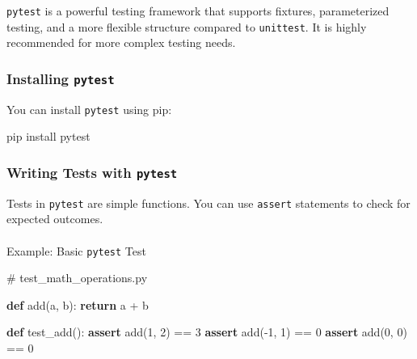 \documentclass[
  letterpaper,
  DIV=11,
  numbers=noendperiod]{scrreprt}
\makeatletter
\let\oldparagraph\paragraph
\renewcommand{\paragraph}{
    \@ifstar
      \xxxParagraphStar
      \xxxParagraphNoStar
  }
\newcommand{\xxxParagraphStar}[1]{\oldparagraph*{#1}\mbox{}}
\newcommand{\xxxParagraphNoStar}[1]{\oldparagraph{#1}\mbox{}}
\newenvironment{Shaded}{\begin{snugshade}}{\end{snugshade}}
\newcommand{\CommentTok}[1]{\textcolor[rgb]{0.37,0.37,0.37}{#1}}
\newcommand{\ControlFlowTok}[1]{\textcolor[rgb]{0.00,0.23,0.31}{\textbf{#1}}}
\newcommand{\DecValTok}[1]{\textcolor[rgb]{0.68,0.00,0.00}{#1}}
\newcommand{\ExtensionTok}[1]{\textcolor[rgb]{0.00,0.23,0.31}{#1}}
\newcommand{\KeywordTok}[1]{\textcolor[rgb]{0.00,0.23,0.31}{\textbf{#1}}}
\newcommand{\NormalTok}[1]{\textcolor[rgb]{0.00,0.23,0.31}{#1}}
\newcommand{\OperatorTok}[1]{\textcolor[rgb]{0.37,0.37,0.37}{#1}}
\makeatother
\begin{document}
\texttt{pytest} is a powerful testing framework that supports fixtures,
parameterized testing, and a more flexible structure compared to
\texttt{unittest}. It is highly recommended for more complex testing
needs.

\subsubsection{\texorpdfstring{Installing
\texttt{pytest}}{Installing pytest}}\label{installing-pytest}

You can install \texttt{pytest} using pip:

\begin{Shaded}
\begin{Highlighting}[]
\ExtensionTok{pip}\NormalTok{ install pytest}
\end{Highlighting}
\end{Shaded}

\subsubsection{\texorpdfstring{Writing Tests with
\texttt{pytest}}{Writing Tests with pytest}}\label{writing-tests-with-pytest}

Tests in \texttt{pytest} are simple functions. You can use
\texttt{assert} statements to check for expected outcomes.

\paragraph{\texorpdfstring{Example: Basic \texttt{pytest}
Test}{Example: Basic pytest Test}}\label{example-basic-pytest-test}

\begin{Shaded}
\begin{Highlighting}[]
\CommentTok{\# test\_math\_operations.py}

\KeywordTok{def}\NormalTok{ add(a, b):}
    \ControlFlowTok{return}\NormalTok{ a }\OperatorTok{+}\NormalTok{ b}

\KeywordTok{def}\NormalTok{ test\_add():}
    \ControlFlowTok{assert}\NormalTok{ add(}\DecValTok{1}\NormalTok{, }\DecValTok{2}\NormalTok{) }\OperatorTok{==} \DecValTok{3}
    \ControlFlowTok{assert}\NormalTok{ add(}\OperatorTok{{-}}\DecValTok{1}\NormalTok{, }\DecValTok{1}\NormalTok{) }\OperatorTok{==} \DecValTok{0}
    \ControlFlowTok{assert}\NormalTok{ add(}\DecValTok{0}\NormalTok{, }\DecValTok{0}\NormalTok{) }\OperatorTok{==} \DecValTok{0}
\end{Highlighting}
\end{Shaded}
\end{document}
